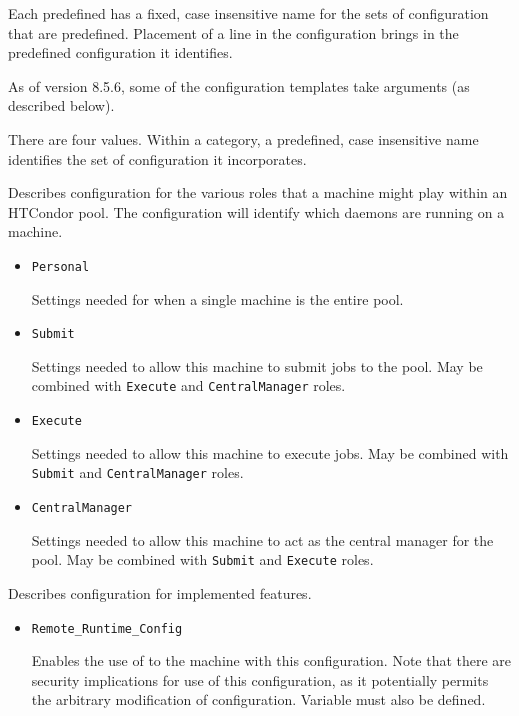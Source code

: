 Each predefined  has a fixed, case insensitive
name for the sets of configuration that are predefined. 
Placement of a  line in the configuration brings in
the predefined configuration it identifies.

As of version 8.5.6, some of the configuration templates take arguments
(as described below).

There are four  values.
Within a category, a predefined, case insensitive name identifies
the set of configuration it incorporates. 
\begin{description}

\label{usecategory:ROLE}
\item[\MacroNI{ROLE category}]
  Describes configuration for the various roles that a machine might
  play within an HTCondor pool. The configuration will identify which
  daemons are running on a machine.
  \begin{itemize}
    \item \texttt{Personal}

    Settings needed for when a single machine is the entire pool.

    \item \texttt{Submit}

    Settings needed to allow this machine to submit jobs to the pool.
    May be combined with \texttt{Execute} and \texttt{CentralManager} roles.

    \item \texttt{Execute}

    Settings needed to allow this machine to execute jobs.
    May be combined with \texttt{Submit} and \texttt{CentralManager} roles.

    \item \texttt{CentralManager}

    Settings needed to allow this machine to act as the central manager
    for the pool.
    May be combined with \texttt{Submit} and \texttt{Execute} roles.
  \end{itemize}

\label{usecategory:FEATURE}
\item[\MacroNI{FEATURE category}]
  Describes configuration for implemented features. 
  \begin{itemize}
    \item \texttt{Remote\_Runtime\_Config}

    Enables the use of   to the machine with
    this configuration.
    Note that there are security implications for use of this configuration,
    as it potentially permits the arbitrary modification of configuration.
    Variable  must also be defined.


\end{itemize}
\end{description}

